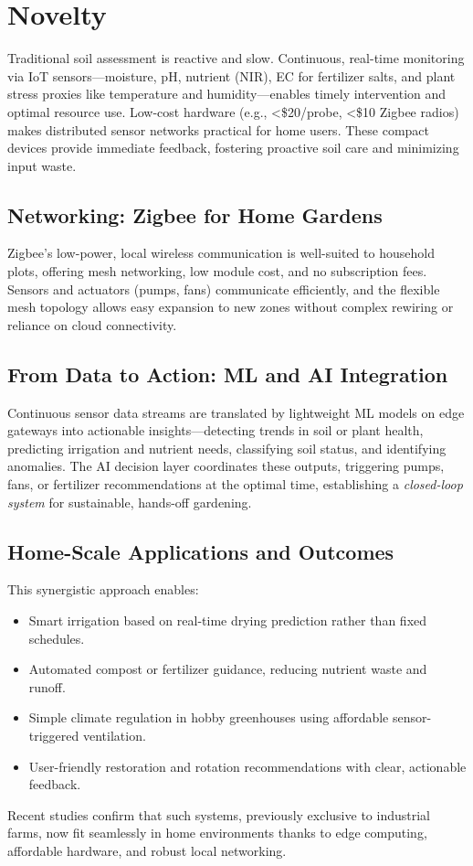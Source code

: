 \documentclass{sigchi}
\begin{document}
\section{Novelty}

Traditional soil assessment is reactive and slow. Continuous, real-time monitoring via IoT sensors—moisture, pH, nutrient (NIR), EC for fertilizer salts, and plant stress proxies like temperature and humidity—enables timely intervention and optimal resource use. Low-cost hardware (e.g., <\$20/probe, <\$10 Zigbee radios) makes distributed sensor networks practical for home users. These compact devices provide immediate feedback, fostering proactive soil care and minimizing input waste.

\subsection{Networking: Zigbee for Home Gardens}

Zigbee’s low-power, local wireless communication is well-suited to household plots, offering mesh networking, low module cost, and no subscription fees. Sensors and actuators (pumps, fans) communicate efficiently, and the flexible mesh topology allows easy expansion to new zones without complex rewiring or reliance on cloud connectivity.

\subsection{From Data to Action: ML and AI Integration}

Continuous sensor data streams are translated by lightweight ML models on edge gateways into actionable insights—detecting trends in soil or plant health, predicting irrigation and nutrient needs, classifying soil status, and identifying anomalies. The AI decision layer coordinates these outputs, triggering pumps, fans, or fertilizer recommendations at the optimal time, establishing a \emph{closed-loop system} for sustainable, hands-off gardening.

\subsection{Home-Scale Applications and Outcomes}

This synergistic approach enables:
\begin{itemize}
	\item Smart irrigation based on real-time drying prediction rather than fixed schedules.
	\item Automated compost or fertilizer guidance, reducing nutrient waste and runoff.
	\item Simple climate regulation in hobby greenhouses using affordable sensor-triggered ventilation.
	\item User-friendly restoration and rotation recommendations with clear, actionable feedback.
\end{itemize}
Recent studies confirm that such systems, previously exclusive to industrial farms, now fit seamlessly in home environments thanks to edge computing, affordable hardware, and robust local networking.
\end{document}
